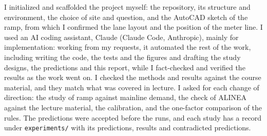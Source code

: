 \documentclass[11pt,letterpaper]{article}
\begin{document}
I initialized and scaffolded the project myself: the repository, its structure and
environment, the choice of site and question, and the AutoCAD sketch of the ramp, from
which I confirmed the lane layout and the position of the meter line. I used an AI
coding assistant, Claude (Claude Code, Anthropic), mainly for implementation: working
from my requests, it automated the rest of the work, including writing the code, the
tests and the figures and drafting the study designs, the predictions and this report,
while I fact-checked and verified the results as the work went on. I checked the
methods and results against the course material, and they match what was covered in
lecture. I asked for each change of direction: the study of ramp against mainline
demand, the check of ALINEA against the lecture material, the calibration, and the
one-factor comparison of the rules. The predictions were accepted before the runs, and
each study has a record under \texttt{experiments/} with its predictions, results and
contradicted predictions.
\end{document}
